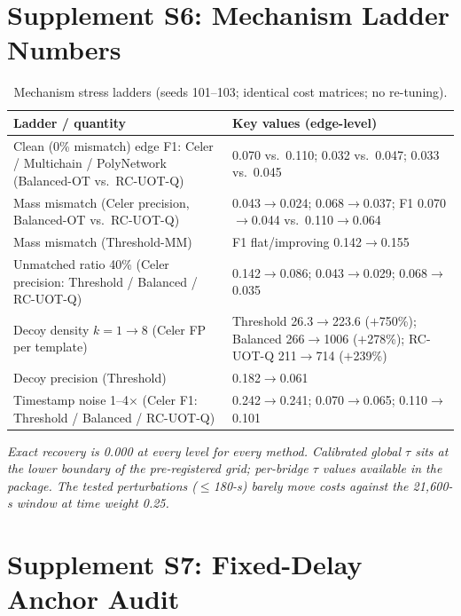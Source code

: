 \documentclass[journal]{IEEEtran}
\begin{document}
\section*{Supplement S6: Mechanism Ladder Numbers}

\begin{table}[!t]
\caption{Mechanism stress ladders (seeds 101--103; identical cost matrices; no re-tuning).}
\label{tab:S6}
\centering
\footnotesize
\begin{tabular}{L{0.62\columnwidth}L{0.30\columnwidth}}
\toprule
Ladder / quantity & Key values (edge-level) \\
\midrule
Clean (0\% mismatch) edge F1: Celer / Multichain / PolyNetwork (Balanced-OT vs.\ RC-UOT-Q) & 0.070 vs.\ 0.110; 0.032 vs.\ 0.047; 0.033 vs.\ 0.045 \\
Mass mismatch (Celer precision, Balanced-OT vs.\ RC-UOT-Q) & 0.043$\to$0.024; 0.068$\to$0.037; F1 0.070$\to$0.044 vs.\ 0.110$\to$0.064 \\
Mass mismatch (Threshold-MM) & F1 flat/improving 0.142$\to$0.155 \\
Unmatched ratio 40\% (Celer precision: Threshold / Balanced / RC-UOT-Q) & 0.142$\to$0.086; 0.043$\to$0.029; 0.068$\to$0.035 \\
Decoy density $k{=}1{\to}8$ (Celer FP per template) & Threshold 26.3$\to$223.6 ($+$750\%); Balanced 266$\to$1006 ($+$278\%); RC-UOT-Q 211$\to$714 ($+$239\%) \\
Decoy precision (Threshold) & 0.182$\to$0.061 \\
Timestamp noise 1--4$\times$ (Celer F1: Threshold / Balanced / RC-UOT-Q) & 0.242$\to$0.241; 0.070$\to$0.065; 0.110$\to$0.101 \\
\bottomrule
\end{tabular}
\end{table}

\emph{Exact recovery is 0.000 at every level for every method. Calibrated global $\tau$ sits at the lower boundary of the pre-registered grid; per-bridge $\tau$ values available in the package. The tested perturbations ($\le$180-s) barely move costs against the 21{,}600-s window at time weight 0.25.}

\section*{Supplement S7: Fixed-Delay Anchor Audit}
\end{document}
